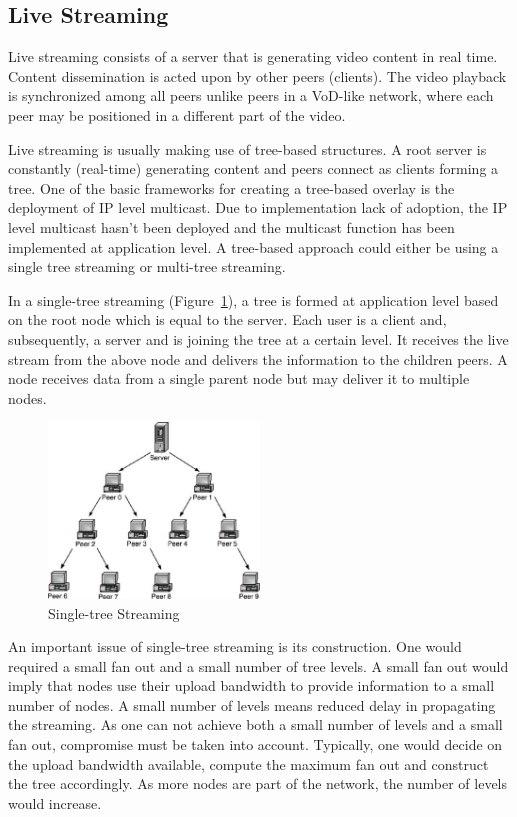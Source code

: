 \subsection{Live Streaming}
\label{subsec:p2p-systems:ls}

Live streaming consists of a server that is generating video content in real
time. Content dissemination is acted upon by other peers (clients). The video
playback is synchronized among all peers unlike peers in a VoD-like network,
where each peer may be positioned in a different part of the video.

Live streaming is usually making use of tree-based structures. A root server
is constantly (real-time) generating content and peers connect as clients
forming a tree. One of the basic frameworks for creating a tree-based overlay
is the deployment of IP level multicast. Due to implementation lack of
adoption, the IP level multicast hasn't been deployed and the multicast
function has been implemented at application level. A tree-based approach
could either be using a single tree streaming or multi-tree streaming.

In a single-tree streaming (Figure~\ref{fig:p2p-systems:single-tree-streaming}), a tree is
formed at application level based on the
root node which is equal to the server. Each user is a client and,
subsequently, a server and is joining the tree at a certain level. It receives
the live stream from the above node and delivers the information to the
children peers. A node receives data from a single parent node but may deliver
it to multiple nodes.

\begin{figure}
  \centering
  \includegraphics[width=0.5\textwidth]{src/img/p2p-systems/single-tree-streaming}
  \caption{Single-tree Streaming}
  \label{fig:p2p-systems:single-tree-streaming}
\end{figure}

An important issue of single-tree streaming is its construction. One would
required a small fan out and a small number of tree levels. A small fan out
would imply that nodes use their upload bandwidth to provide information to a
small number of nodes. A small number of levels means reduced delay in
propagating the streaming. As one can not achieve both a small number of
levels and a small fan out, compromise must be taken into account. Typically,
one would decide on the upload bandwidth available, compute the maximum fan
out and construct the tree accordingly. As more nodes are part of the network,
the number of levels would increase.

